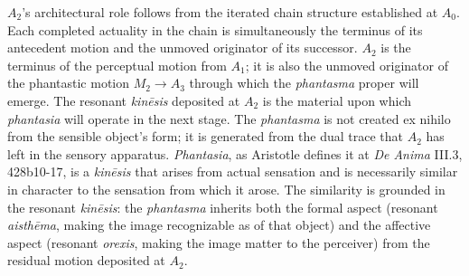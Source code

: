 \documentclass[12pt]{article}
\begin{document}
$A_2$'s architectural role follows from the iterated chain structure established at $A_0$. Each completed actuality in the chain is simultaneously the terminus of its antecedent motion and the unmoved originator of its successor. $A_2$ is the terminus of the perceptual motion from $A_1$; it is also the unmoved originator of the phantastic motion $M_2$$\to$$A_3$ through which the \textit{phantasma} proper will emerge. The resonant \textit{kinēsis} deposited at $A_2$ is the material upon which \textit{phantasia} will operate in the next stage. The \textit{phantasma} is not created ex nihilo from the sensible object's form; it is generated from the dual trace that $A_2$ has left in the sensory apparatus. \textit{Phantasia}, as Aristotle defines it at \textit{De Anima} III.3, 428b10-17, is a \textit{kinēsis} that arises from actual sensation and is necessarily similar in character to the sensation from which it arose. The similarity is grounded in the resonant \textit{kinēsis}: the \textit{phantasma} inherits both the formal aspect (resonant \textit{aisthēma}, making the image recognizable as of that object) and the affective aspect (resonant \textit{orexis}, making the image matter to the perceiver) from the residual motion deposited at $A_2$.
\end{document}
